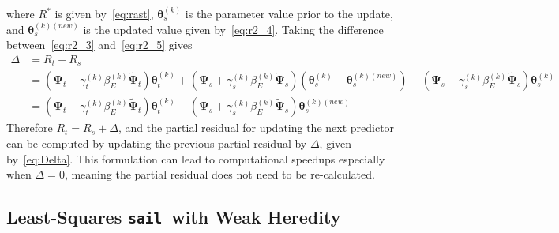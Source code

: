 \documentclass[12pt,letter]{article}\usepackage[]{graphicx}\usepackage[]{color}
\newcommand{\sail}{\texttt{sail}}
\newcommand{\btheta}{\boldsymbol{\theta}}
\newcommand{\bPsi}{\boldsymbol{\Psi}}
\begin{document}
where $R^\ast$ is given by~\eqref{eq:rast}, $\btheta_s^{(k)}$ is the parameter value prior to the update, and $\btheta_s^{(k)(new)}$ is the updated value given by~\eqref{eq:r2_4}. Taking the difference between~\eqref{eq:r2_3} and~\eqref{eq:r2_5} gives
\begin{align}
\Delta & = R_t - R_s \nonumber\\
& = (\bPsi_t + \gamma_t^{(k)}\beta_E^{(k)} \widetilde{\bPsi}_t)\btheta_t^{(k)} + (\bPsi_s + \gamma_s^{(k)}\beta_E^{(k)} \widetilde{\bPsi}_s)(\btheta_s^{(k)} - \btheta_s^{(k)(new)}) - (\bPsi_s + \gamma_s^{(k)}\beta_E^{(k)} \widetilde{\bPsi}_s)\btheta_s^{(k)} \nonumber\\
& = (\bPsi_t + \gamma_t^{(k)}\beta_E^{(k)} \widetilde{\bPsi}_t)\btheta_t^{(k)} - (\bPsi_s + \gamma_s^{(k)}\beta_E^{(k)} \widetilde{\bPsi}_s)\btheta_s^{(k)(new)} \label{eq:Delta}
\end{align} 
Therefore $R_t = R_s + \Delta$, and the partial residual for updating the next predictor can be computed by updating the previous partial residual by $\Delta$, given by~\eqref{eq:Delta}. This formulation can lead to computational speedups especially when $\Delta = 0$, meaning the partial residual does not need to be re-calculated.  



\subsection{Least-Squares \sail ~with Weak Heredity} \label{ap:subsec:lssailweak}
\end{document}
